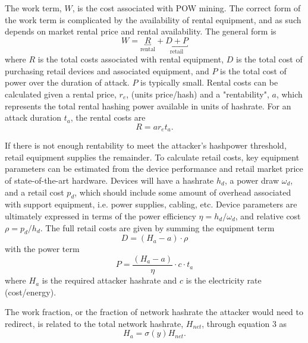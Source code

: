 \documentclass[a4paper,12pt]{article}
\begin{document}
The work term, $W$, is the cost associated with POW mining. The correct form of the work term is complicated by the availability of rental equipment, and as such depends on market rental price and rental availability. The general form is
%
\begin{equation}
W =  \underbracket{R}_{\text{rental}} + \underbracket{D + P}_{\text{retail}}
\end{equation}
%
where $R$ is the total costs associated with rental equipment, $D$ is the total cost of purchasing retail devices and associated equipment, and $P$ is the total cost of power over the duration of attack. $ P $ is typically small. Rental costs can be calculated given a rental price, $r_e$, (units price/hash) and a "rentability", $a$,  which represents the total rental hashing power available in units of hashrate. For an attack duration $t_a$, the rental costs are 
%
\begin{equation}
R = a r_e t_a.
\end{equation}

If there is not enough rentability to meet the attacker's hashpower threshold, retail equipment supplies the remainder. To calculate retail costs, key equipment parameters can be estimated from the device performance and retail market price of state-of-the-art hardware. Devices will have a hashrate $h_d$, a power draw $\omega_d$, and a retail cost $p_d$, which should include some amount of overhead associated with support equipment, i.e. power supplies, cabling, etc. Device parameters are ultimately expressed in terms of the power efficiency $\eta = h_d / \omega_d$, and relative cost $\rho = p_d / h_d$. The full retail costs are given by summing the equipment term
%
\begin{equation}
D = ( H_a - a )  \cdot \rho
\end{equation}
%
with the power term
%
\begin{equation}
P = \frac{ ( H_a - a ) }{ \eta } \cdot c \cdot t_a
\end{equation}
%
where $H_a$ is the required attacker hashrate and $c$ is the electricity rate (cost/energy). 

The work fraction, or the fraction of network hashrate the attacker would need to redirect, is related to the total network hashrate, $H_{net}$, through equation 3 as 
%
\begin{equation}
H_a = \sigma(y)H_{net}.
\end{equation}
 
\end{document}
